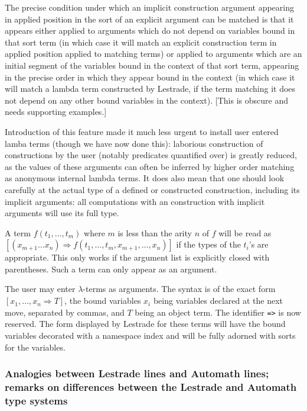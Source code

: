 \documentclass[12pt]{article}
\begin{document}
\begin{description}
The precise condition under which an implicit construction argument appearing in applied position in the sort of an explicit argument
can be matched is that it appears either applied to arguments which do not depend on variables bound in that sort term (in which case it will match an explicit construction term in applied position applied to matching terms) or applied to arguments which are an initial segment of the variables bound in the context of that sort term, appearing in the precise order in which they appear bound in the context (in which case it will match a lambda term constructed by Lestrade, if the term matching it does not depend on any other bound variables in the context). [This is obscure and needs supporting examples.]

Introduction of this feature made it much less urgent to install user entered lamba terms (though we have now done this):  laborious construction of constructions by the user (notably predicates quantified over) is greatly reduced, as the values of these arguments can often be inferred by higher order matching as anonymous internal lambda terms.  It does also mean that one should look carefully at the actual type of a defined or constructed construction, including its implicit arguments:  all computations with an construction with implicit arguments will use its full type.

A term $f(t_1,\ldots,t_m)$ where $m$ is less than the arity $n$ of $f$ will be read as $[(x_{m+1}\ldots x_n) \Rightarrow f(t_1,\ldots,t_m,x_{m+1},\dots,x_n)]$ if the types of the $t_i$'s are appropriate.  This only works if the argument list is explicitly closed with parentheses.  Such a term can only appear as an argument.

The user may enter $\lambda$-terms as arguments.  The syntax is of the exact form $[x_1,\ldots,x_n \Rightarrow T]$, the bound variables $x_i$ being variables declared at the next move, separated by commas, and $T$ being an object term.  The identifier {\tt =>} is now reserved.  The form displayed by Lestrade for these terms will have the bound variables decorated with a namespace index and will be fully adorned with sorts for the variables.

\end{description}

\newpage 

\subsubsection{Analogies between Lestrade lines and Automath lines; remarks on differences between the Lestrade and Automath type systems}
\end{document}
